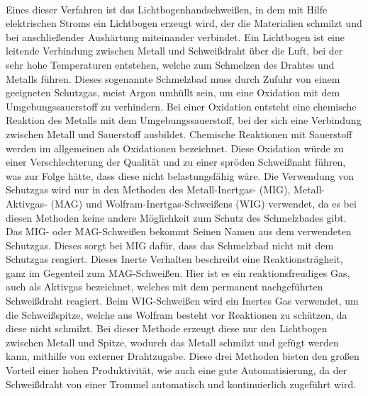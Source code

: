 \\Eines dieser Verfahren ist das 
Lichtbogenhandschweißen, in dem mit Hilfe elektrischen Stroms ein Lichtbogen erzeugt wird, der die Materialien schmilzt und bei anschließender Aushärtung 
miteinander verbindet. Ein Lichtbogen ist eine leitende Verbindung zwischen Metall und Schweißdraht über die Luft, bei der sehr hohe Temperaturen entstehen, 
welche zum Schmelzen des Drahtes und Metalls führen. Dieses sogenannte Schmelzbad muss durch Zufuhr von einem geeigneten Schutzgas, meist Argon umhüllt sein,
um eine Oxidation mit dem Umgebungssauerstoff zu verhindern. Bei einer Oxidation entsteht eine chemische Reaktion des Metalls mit dem Umgebungssauerstoff, 
bei der sich eine Verbindung zwischen Metall und Sauerstoff ausbildet. 
Chemische Reaktionen mit Sauerstoff werden im allgemeinen als Oxidationen bezeichnet.
Diese Oxidation würde zu einer Verschlechterung der Qualität und zu einer spröden Schweißnaht führen, was zur Folge hätte, dass diese nicht belastungsfähig 
wäre.
Die Verwendung von Schutzgas wird nur in den Methoden des Metall-Inertgas- (MIG), Metall-Aktivgas- (MAG) und Wolfram-Inertgas-Schweißens (WIG) 
verwendet, da es bei diesen Methoden keine andere Möglichkeit zum Schutz des Schmelzbades gibt. Das MIG- oder MAG-Schweißen bekommt Seinen Namen aus dem 
verwendeten Schutzgas. Dieses sorgt bei MIG dafür, dass das Schmelzbad nicht mit dem Schutzgas reagiert. Dieses Inerte Verhalten beschreibt eine
Reaktionsträgheit, ganz im Gegenteil zum MAG-Schweißen. Hier ist es ein reaktionsfreudiges Gas, auch als Aktivgas bezeichnet, welches mit dem permanent 
nachgeführten Schweißdraht reagiert. 
Beim WIG-Schweißen wird ein Inertes Gas verwendet, um die Schweißspitze, welche aus Wolfram besteht vor Reaktionen zu
schützen, da diese nicht schmilzt. Bei dieser Methode erzeugt diese nur den Lichtbogen zwischen Metall und Spitze, wodurch das Metall schmilzt und gefügt 
werden kann, mithilfe von externer Drahtzugabe. Diese drei Methoden bieten den großen Vorteil einer hohen Produktivität, wie auch eine gute Automatisierung,
da der Schweißdraht von einer Trommel automatisch und kontinuierlich zugeführt wird. 
\clearpage

